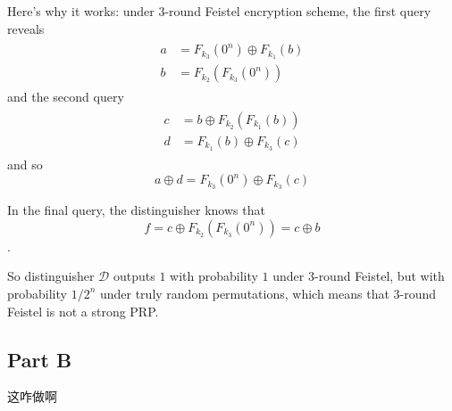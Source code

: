 \documentclass[8pt]{article}
\theoremstyle{compact}
\begin{document}
Here's why it works: under 3-round Feistel encryption scheme, the first query reveals \begin{align*}
	\begin{split}
		a &= F_{k_3}(0^n) \oplus F_{k_1}(b) \\
		b &= F_{k_2}(F_{k_3}(0^n))
	\end{split}
\end{align*}
and the second query \begin{align*}
	\begin{split}
		c &= b \oplus F_{k_2}(F_{k_1}(b)) \\
		d &= F_{k_1}(b) \oplus F_{k_3}(c)
	\end{split}
\end{align*}
and so $$a \oplus d = F_{k_3}(0^n) \oplus F_{k_3}(c)$$ 

In the final query, the distinguisher knows that $$f = c \oplus F_{k_2}(F_{k_3}(0^n)) = c \oplus b$$.

So distinguisher $\mathcal D$ outputs $1$ with probability $1$ under 3-round Feistel, but with probability $1/2^n$ under truly random permutations, which means that 3-round Feistel is not a strong PRP.

\subsection*{Part B}
这咋做啊
\end{document}

